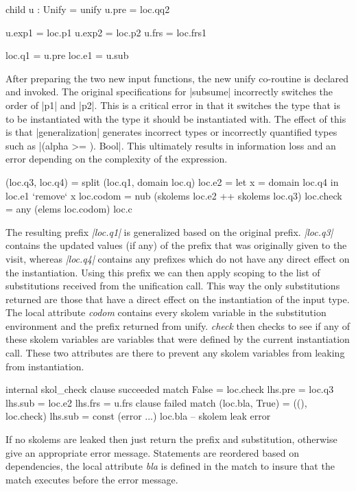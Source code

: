 \begin{code}
child u : Unify = unify
u.pre  = loc.qq2

u.exp1  = loc.p1
u.exp2  = loc.p2
u.frs   = loc.frs1
        
loc.q1  = u.pre
loc.e1  = u.sub
\end{code}
After preparing the two new input functions, the new unify co-routine is declared and invoked. The original specifications for |subsume| incorrectly switches the order of |p1| and |p2|. This is a critical error in that it switches the type that is to be instantiated with the type it should be instantiated with. The effect of this is that |generalization| generates incorrect types or incorrectly quantified types such as |(alpha >= \bot). Bool|.
This ultimately results in information loss and an error depending on the complexity of the expression.

\begin{code}   
(loc.q3, loc.q4) = split (loc.q1, domain loc.q)
loc.e2 =  let x = domain loc.q4
          in loc.e1 `remove` x
loc.codom  = nub (skolems loc.e2 ++ skolems loc.q3)
loc.check  = any (elems loc.codom) loc.c
\end{code}
The resulting prefix \emph{|loc.q1|} is generalized based on the original prefix. \emph{|loc.q3|} contains the updated values (if any) of the prefix that was originally given to the visit, whereas \emph{|loc.q4|} contains any prefixes which do not have any direct effect on the instantiation. Using this prefix we can then apply scoping to the list of substitutions received from the unification call. This way the only substitutions returned are those that have a direct effect on the instantiation of the input type.
The local attribute \emph{codom} contains every skolem variable in the substitution environment and the prefix returned from unify. \emph{check} then checks to see if any of these skolem variables are variables that were defined by the current instantiation call. These two attributes are there to prevent any skolem variables from leaking from instantiation.

\begin{code}
internal skol_check
  clause succeeded
    match False  = loc.check
    lhs.pre  = loc.q3
    lhs.sub  = loc.e2
    lhs.frs  = u.frs
  clause failed
    match (loc.bla, True) = ((), loc.check)
    lhs.sub = const (error ...) loc.bla -- skolem leak error
\end{code}
If no skolems are leaked then just return the prefix and substitution, otherwise give an appropriate error message. Statements are reordered based on dependencies, the local attribute \emph{bla} is defined in the match to insure that the match executes before the error message.

